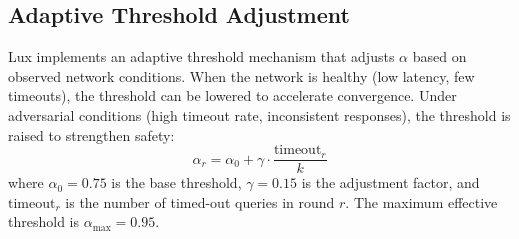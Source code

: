 \subsection{Adaptive Threshold Adjustment}

Lux implements an adaptive threshold mechanism that adjusts $\alpha$ based on observed
network conditions. When the network is healthy (low latency, few timeouts), the threshold
can be lowered to accelerate convergence. Under adversarial conditions (high timeout rate,
inconsistent responses), the threshold is raised to strengthen safety:
\begin{equation}
\alpha_r = \alpha_0 + \gamma \cdot \frac{\text{timeout}_r}{k}
\end{equation}
where $\alpha_0 = 0.75$ is the base threshold, $\gamma = 0.15$ is the adjustment factor,
and $\text{timeout}_r$ is the number of timed-out queries in round $r$. The maximum
effective threshold is $\alpha_{\max} = 0.95$.

